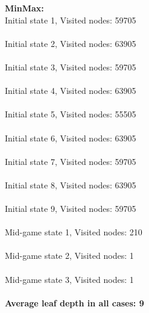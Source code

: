 \documentclass{article}
\begin{document}
\begin{minipage}[t]{0.6667\textwidth}

\smallskip
\textbf{MinMax:}\\
Initial state 1, Visited nodes: 59705\\\\
Initial state 2, Visited nodes: 63905\\\\
Initial state 3, Visited nodes: 59705\\\\
Initial state 4, Visited nodes: 63905\\\\
Initial state 5, Visited nodes: 55505\\\\
Initial state 6, Visited nodes: 63905\\\\
Initial state 7, Visited nodes: 59705\\\\
Initial state 8, Visited nodes: 63905\\\\
Initial state 9, Visited nodes: 59705\\\\
Mid-game state 1, Visited nodes: 210\\\\
Mid-game state 2, Visited nodes: 1\\\\
Mid-game state 3, Visited nodes: 1\\\\
\textbf{Average leaf depth in all cases: 9}\\
\end{minipage}
\end{document}
